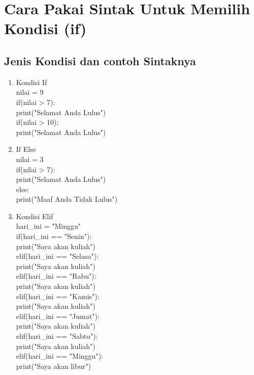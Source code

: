 \documentclass{article}
\begin{document}
\section{Cara Pakai Sintak Untuk Memilih Kondisi (if)}
\subsection {Jenis Kondisi dan contoh Sintaknya}
\usepackage{Terdapat tiga macam kondisional yang ada di Python, dan dapat digunakan untuk membangun alur logika untuk program Anda.Berikut adalah contohnya..}
\begin{enumerate}
    \item Kondisi If\\
     nilai = 9\\
if(nilai > 7):\\
    print("Selamat Anda Lulus")\\
if(nilai > 10):\\
    print("Selamat Anda Lulus")\\
    
    \item If Else\\
    nilai = 3\\
    if(nilai > 7):\\
    print("Selamat Anda Lulus")\\
    else:\\
    print("Maaf Anda Tidak Lulus")\\
 
    \item Kondisi Elif\\
    hari_ini = "Minggu"\\
    if(hari_ini == "Senin"):\\
    print("Saya akan kuliah")\\
    elif(hari_ini == "Selasa"):\\
    print("Saya akan kuliah")\\
    elif(hari_ini == "Rabu"):\\
    print("Saya akan kuliah")\\
    elif(hari_ini == "Kamis"):\\
    print("Saya akan kuliah")\\
    elif(hari_ini == "Jumat"):\\
    print("Saya akan kuliah")\\
    elif(hari_ini == "Sabtu"):\\
    print("Saya akan kuliah")\\
    elif(hari_ini == "Minggu"):\\
    print("Saya akan libur")\\
\end{enumerate}
\end{document}
